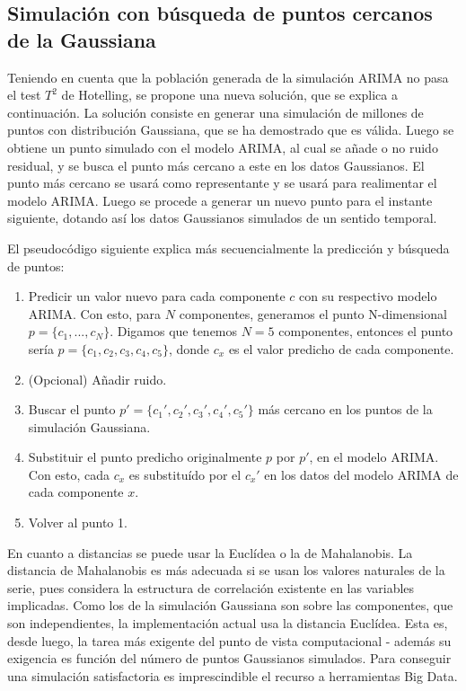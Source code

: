 \documentclass[11pt,spanish,listoffigures,listoftables]{tfgetsinf}
\begin{document}
        
        \subsection{Simulación con búsqueda de puntos cercanos de la Gaussiana}
        Teniendo en cuenta que la población generada de la simulación ARIMA no pasa el test \(T^2\) de Hotelling, se propone una nueva solución, que se explica a continuación. La solución consiste en generar una simulación de millones de puntos con distribución Gaussiana, que se ha demostrado que es válida. Luego se obtiene un punto simulado con el modelo ARIMA, al cual se añade o no ruido residual, y se busca el punto más cercano a este en los datos Gaussianos. El punto más cercano se usará como representante y se usará para realimentar el modelo ARIMA. Luego se procede a generar un nuevo punto para el instante siguiente, dotando así los datos Gaussianos simulados de un sentido temporal.
        
        El pseudocódigo siguiente explica más secuencialmente la predicción y búsqueda de puntos: 
        \begin{enumerate}
        \item Predicir un valor nuevo para cada componente \(c\) con su respectivo modelo ARIMA. Con esto, para \(N\) componentes, generamos el punto N-dimensional \(p = \{c_{1}, ..., c_{N}\}\). Digamos que tenemos \(N=5\) componentes, entonces el punto sería \(p = \{c_{1}, c_{2}, c_{3}, c_{4}, c_{5}\}\), donde \(c_{x}\) es el valor predicho de cada componente.
        \item (Opcional) Añadir ruido.
        \item Buscar el punto \(p' = \{c_{1}', c_{2}', c_{3}', c_{4}', c_{5}'\}\) más cercano en los puntos de la simulación Gaussiana.
        \item Substituir el punto predicho originalmente \(p\) por \(p'\), en el modelo ARIMA. Con esto, cada \(c_{x}\) es substituído por el \(c_{x}'\) en los datos del modelo ARIMA de cada componente \(x\).
        \item Volver al punto 1.
        \end{enumerate}

	En cuanto a distancias se puede usar la Euclídea o la de Mahalanobis. La distancia de Mahalanobis es más adecuada si se usan los valores naturales de la serie, pues considera la estructura de correlación existente en las variables implicadas. Como los de la simulación Gaussiana son sobre las componentes, que son independientes, la implementación actual usa la distancia Euclídea. Esta es, desde luego, la tarea más exigente del punto de vista computacional - además su exigencia es función del número de puntos Gaussianos simulados. Para conseguir una simulación satisfactoria es imprescindible el recurso a herramientas Big Data.
	
\end{document}
